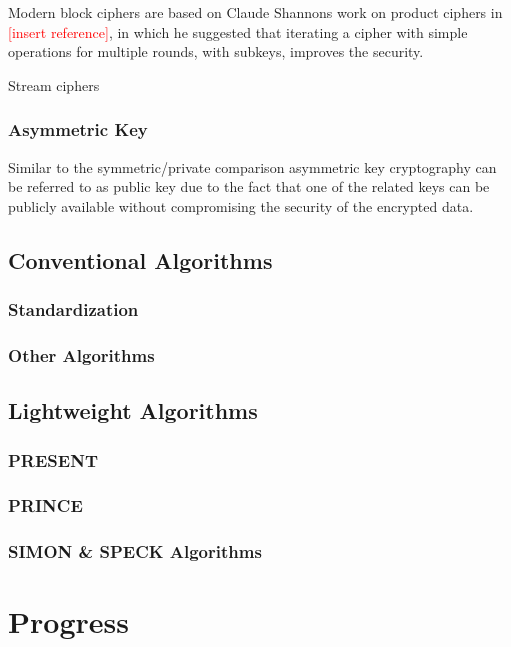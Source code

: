 \documentclass[12pt,twoside,a4paper]{report}
\begin{document}
    Modern block ciphers are based on Claude Shannons work on product ciphers in \textcolor{red}{[insert reference]}, in which he suggested that iterating a cipher with simple operations for multiple rounds, with subkeys, improves the security.
    
    Stream ciphers 
	
	\subsection{Asymmetric Key}
    Similar to the symmetric/private comparison asymmetric key cryptography can be referred to as public key due to the fact that one of the related keys can be publicly available without compromising the security of the encrypted data.
    
    \section{Conventional Algorithms}
    
    \subsection{Standardization}
    
    \subsection{Other Algorithms}
    
    \section{Lightweight Algorithms}
    
    \subsection{PRESENT}
    
    \subsection{PRINCE}
    
    \subsection{SIMON \& SPECK Algorithms}
    
    \chapter{Progress}
    
\end{document}
